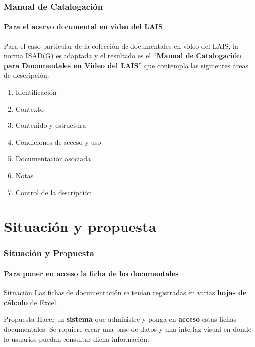 \documentclass{beamer}
\begin{document}
\begin{frame}
	\frametitle{Manual de Catalogación}
	\framesubtitle{Para el acervo documental en video del LAIS}
	
	Para el caso particular de la colección de documentales en video del LAIS, la norma ISAD(G) es adaptada y el resultado es el ``\textbf{Manual de Catalogación para Documentales en Video del LAIS}'' que contempla las siguientes áreas de descripción:
	
	\begin{enumerate}
		\item Identificación
		\item Contexto
		\item Contenido y estructura
		\item Condiciones de acceso y uso
		\item Documentación asociada
		\item Notas
		\item Control de la descripción
	\end{enumerate}
\end{frame}


\section{Situación y propuesta}
\begin{frame}
	\frametitle{Situación y Propuesta}
	\framesubtitle{Para poner en acceso la ficha de los documentales}
	
	\begin{block}{Situación}
	Las fichas de documentación se tenían registradas en varias \textbf{hojas de cálculo} de Excel.
	\end{block} \pause
	
	\begin{block}{Propuesta}
	Hacer un \textbf{sistema} que administre y ponga en \textbf{acceso} estas fichas documentales. Se requiere crear una base de datos y una interfaz visual en donde lo usuarios puedan consultar dicha información.
	\end{block}
	
\end{frame}
\end{document}
